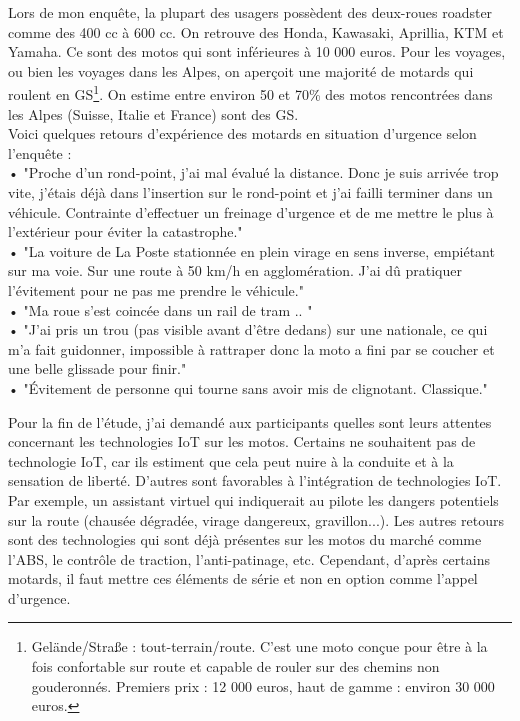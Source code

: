 Lors de mon enquête, la plupart des usagers possèdent des deux-roues roadster comme des 400 cc à 600 cc. On retrouve des Honda, Kawasaki, Aprillia, KTM et Yamaha. Ce sont des motos qui sont inférieures à 10 000 euros.
Pour les voyages, ou bien les voyages dans les Alpes, on aperçoit une majorité de motards qui roulent en GS\footnote{Gelände/Straße : tout-terrain/route. C'est une moto conçue pour être à la fois confortable sur route et capable de rouler sur des chemins non gouderonnés. Premiers prix : 12 000 euros, haut de gamme : environ 30 000 euros.}. On estime entre environ 50 et 70\% des motos rencontrées dans les Alpes (Suisse, Italie et France) sont des GS.\\
Voici quelques retours d'expérience des motards en situation d'urgence selon l'enquête :\\
• "Proche d'un rond-point, j'ai mal évalué la distance. Donc je suis arrivée trop vite, j'étais déjà dans l'insertion sur le rond-point et j'ai failli terminer dans un véhicule. Contrainte d'effectuer un freinage d'urgence et de me mettre le plus à l'extérieur pour éviter la catastrophe."\\
• "La voiture de La Poste stationnée en plein virage en sens inverse, empiétant sur ma voie. Sur une route à 50 km/h en agglomération. J'ai dû pratiquer l'évitement pour ne pas me prendre le véhicule."\\
• "Ma roue s’est coincée dans un rail de tram .. "\\
• "J'ai pris un trou (pas visible avant d'être dedans) sur une nationale, ce qui m'a fait guidonner, impossible à rattraper donc la moto a fini par se coucher et une belle glissade pour finir."\\
• "Évitement de personne qui tourne sans avoir mis de clignotant. Classique."
\vspace{0.5cm}

Pour la fin de l'étude, j'ai demandé aux participants quelles sont leurs attentes concernant les technologies IoT sur les motos. Certains ne souhaitent pas de technologie IoT, car ils estiment que cela peut nuire à la conduite et à la sensation de liberté. D'autres sont favorables à l'intégration de technologies IoT. Par exemple, un assistant virtuel qui indiquerait au pilote les dangers potentiels sur la route (chausée dégradée, virage dangereux, gravillon...). Les autres retours sont des technologies qui sont déjà présentes sur les motos du marché comme l'ABS, le contrôle de traction, l'anti-patinage, etc. Cependant, d'après certains motards, il faut mettre ces éléments de série et non en option comme l'appel d'urgence.

